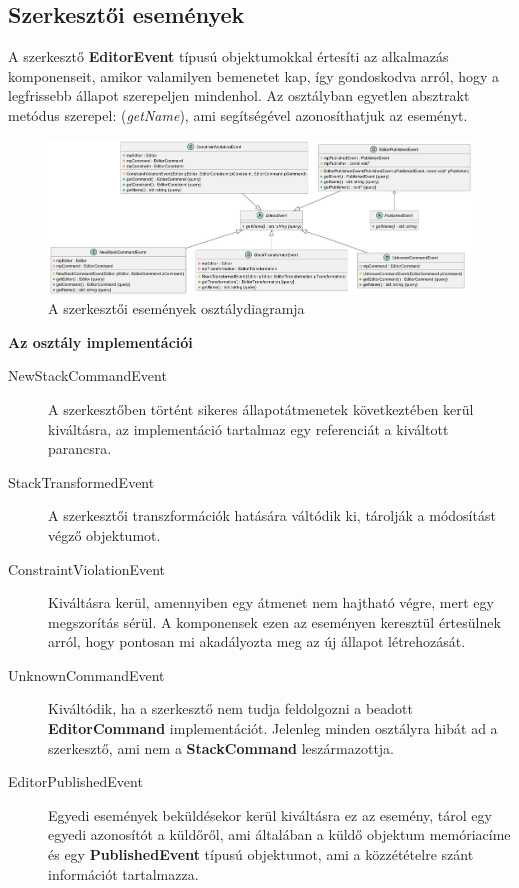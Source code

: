 \subsection{Szerkesztői események}

A szerkesztő \textbf{EditorEvent} típusú objektumokkal értesíti az alkalmazás komponenseit, amikor valamilyen bemenetet kap, így gondoskodva arról, hogy a legfrissebb állapot szerepeljen mindenhol. Az osztályban egyetlen absztrakt metódus szerepel: (\textit{getName}), ami segítségével azonosíthatjuk az eseményt.

\begin{figure}[H]
    \centering
    \includegraphics[width=1\linewidth]{images/class_editor_event.png}
    \caption{A szerkesztői események osztálydiagramja}
    \label{fig:class_editor_event-1}
\end{figure}

\textbf{Az osztály implementációi}

\begin{description}
    \item[NewStackCommandEvent] A szerkesztőben történt sikeres állapotátmenetek következtében kerül kiváltásra, az implementáció tartalmaz egy referenciát a kiváltott parancsra.
    \item[StackTransformedEvent] A szerkesztői transzformációk hatására váltódik ki, tárolják a módosítást végző objektumot.
    \item[ConstraintViolationEvent] Kiváltásra kerül, amennyiben egy átmenet nem hajtható végre, mert egy megszorítás sérül. A komponensek ezen az eseményen keresztül értesülnek arról, hogy pontosan mi akadályozta meg az új állapot létrehozását.
    \item[UnknownCommandEvent] Kiváltódik, ha a szerkesztő nem tudja feldolgozni a beadott \textbf{EditorCommand} implementációt. Jelenleg minden osztályra hibát ad a szerkesztő, ami nem a \textbf{StackCommand} leszármazottja.
    \item[EditorPublishedEvent] Egyedi események beküldésekor kerül kiváltásra ez az esemény, tárol egy egyedi azonosítót a küldőről, ami általában a küldő objektum memóriacíme és egy \textbf{PublishedEvent} típusú objektumot, ami a közzétételre szánt információt tartalmazza.
\end{description}

